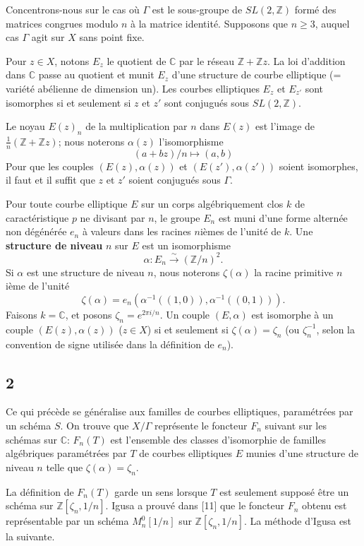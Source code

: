 \documentclass{amsart}
\theoremstyle{plain}
\theoremstyle{remark}
\newcommand{\bbC}{\mathbb{C}}
\newcommand{\bbZ}{\mathbb{Z}}
\begin{document}
Concentrons-nous sur le cas o\`u $\Gamma$ est le sous-groupe de $SL(2,\bbZ)$ form\'e des matrices congrues modulo $n$ \`a la matrice identit\'e. Supposons que $n \geq 3$, auquel cas $\Gamma$ agit sur $X$ sans point fixe.

Pour $z \in X$, notons $E_z$ le quotient de $\bbC$ par le r\'eseau $\bbZ + \bbZ z$. La loi d'addition dans $\bbC$ passe au quotient et munit $E_z$ d'une structure de courbe elliptique (= vari\'et\'e ab\'elienne de dimension un). Les courbes elliptiques $E_z$ et $E_{z'}$ sont isomorphes si et seulement si $z$ et $z'$ sont conjugu\'es sous $SL(2,\bbZ)$.

Le noyau $E(z)_n$ de la multiplication par $n$ dans $E(z)$ est l'image de $\frac{1}{n}(\bbZ + \bbZ z)$; nous noterons $\alpha(z)$ l'isomorphisme
\[
(a+bz)/n \mapsto (a,b)
\]
Pour que les couples $(E(z),\alpha(z))$ et $(E(z'),\alpha(z'))$ soient isomorphes, il faut et il suffit que $z$ et $z'$ soient conjugu\'es sous $\Gamma$.

Pour toute courbe elliptique $E$ sur un corps alg\'ebriquement clos $k$ de caract\'eristique $p$ ne divisant par $n$, le groupe $E_n$ est muni d'une forme altern\'ee non d\'eg\'en\'er\'ee $e_n$ \`a valeurs dans les racines $n$i\`emes de l'unit\'e de $k$. Une \textbf{structure de niveau} $n$ sur $E$ est un isomorphisme
\[
\alpha: E_n \xrightarrow{\sim} (\bbZ/n)^2.
\]
Si $\alpha$ est une structure de niveau $n$, nous noterons $\zeta(\alpha)$ la racine primitive $n$i\`eme de l'unit\'e
\[
\zeta(\alpha) = e_n(\alpha^{-1}((1,0)), \alpha^{-1}((0,1))).
\]
Faisons $k = \bbC$, et posons $\zeta_n = e^{2\pi i/n}$. Un couple $(E,\alpha)$ est isomorphe \`a un couple $(E(z),\alpha(z))$ ($z \in X$) si et seulement si $\zeta(\alpha) = \zeta_n$ (ou $\zeta_n^{-1}$, selon la convention de signe utilis\'ee dans la d\'efinition de $e_n$).

\subsection*{2}
Ce qui pr\'ec\`ede se g\'en\'eralise aux familles de courbes elliptiques, param\'etr\'ees par un sch\'ema $S$. On trouve que $X/\Gamma$ repr\'esente le foncteur $F_n$ suivant sur les sch\'emas sur $\bbC$: $F_n(T)$ est l'ensemble des classes d'isomorphie de familles alg\'ebriques param\'etr\'ees par $T$ de courbes elliptiques $E$ munies d'une structure de niveau $n$ telle que $\zeta(\alpha) = \zeta_n$.

La d\'efinition de $F_n(T)$ garde un sens lorsque $T$ est seulement suppos\'e \^etre un sch\'ema sur $\bbZ[\zeta_n, 1/n]$. Igusa a prouv\'e dans [11] que le foncteur $F_n$ obtenu est repr\'esentable par un sch\'ema $M_n^0[1/n]$ sur $\bbZ[\zeta_n,1/n]$. La m\'ethode d'Igusa est la suivante.
\end{document}
